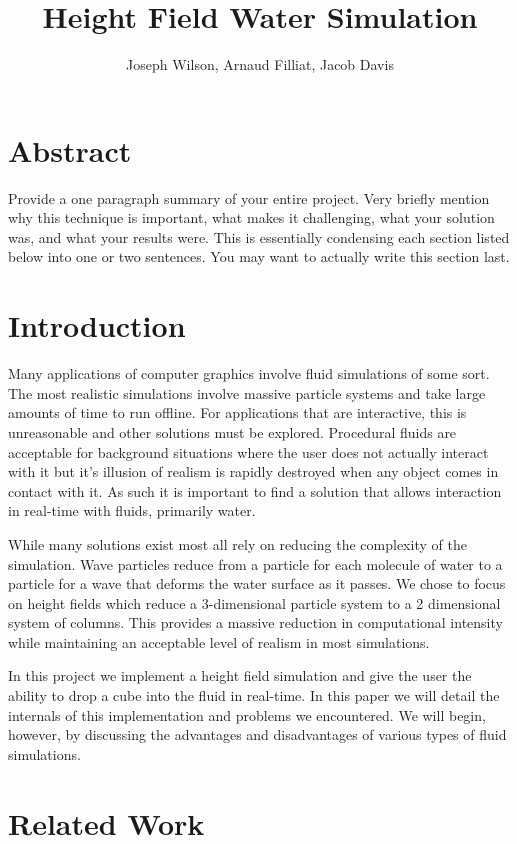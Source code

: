 \documentclass[12pt,titlepage]{article}
\title{Height Field Water Simulation}
\author{Joseph Wilson, Arnaud Filliat, Jacob Davis}
\begin{document}
\maketitle

\section{Abstract}

Provide a one paragraph summary of your entire project. Very briefly mention why this technique is important, what makes it challenging, what your solution was, and what your results were. This is essentially condensing each section listed below into one or two sentences. You may want to actually write this section last.

\section{Introduction}

Many applications of computer graphics involve fluid simulations of some sort.  The most realistic simulations involve massive particle systems and take large amounts of time to run offline.  For applications that are interactive, this is unreasonable and other solutions must be explored.  Procedural fluids are acceptable for background situations where the user does not actually interact with it but it’s illusion of realism is rapidly destroyed when any object comes in contact with it.  As such it is important to find a solution that allows interaction in real-time with fluids, primarily water.

While many solutions exist most all rely on reducing the complexity of the simulation.  Wave particles reduce from a particle for each molecule of water to a particle for a wave that deforms the water surface as it passes.  We chose to focus on height fields which reduce a 3-dimensional particle system to a 2 dimensional system of columns.  This provides a massive reduction in computational intensity while maintaining an acceptable level of realism in most simulations.

In this project we implement a height field simulation and give the user the ability to drop a cube into the fluid in real-time.  In this paper we will detail the internals of this implementation and problems we encountered.  We will begin, however, by discussing the advantages and disadvantages of various types of fluid simulations.

\section{Related Work}
\end{document}

